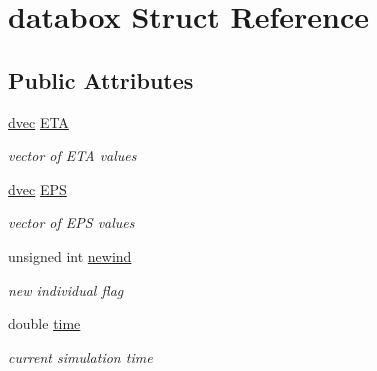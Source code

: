 \hypertarget{structdatabox}{}\section{databox Struct Reference}
\label{structdatabox}
\subsection*{Public Attributes}
\begin{DoxyCompactItemize}
\item 
\mbox{\label{structdatabox_afb21aefbdc05ea9b5aa6ef74231dbcf8}} 
\hyperlink{mrgsolv_8h_ac6aa1a2351760492203846ae74778c05}{dvec} \hyperlink{structdatabox_afb21aefbdc05ea9b5aa6ef74231dbcf8}{E\+TA}
\begin{DoxyCompactList}\small\item\em vector of E\+TA values \end{DoxyCompactList}\item 
\mbox{\label{structdatabox_acd473733c216baace06b5ebfe6b2c18f}} 
\hyperlink{mrgsolv_8h_ac6aa1a2351760492203846ae74778c05}{dvec} \hyperlink{structdatabox_acd473733c216baace06b5ebfe6b2c18f}{E\+PS}
\begin{DoxyCompactList}\small\item\em vector of E\+PS values \end{DoxyCompactList}\item 
\mbox{\label{structdatabox_abc3c551fc2e74c072e5950de8b1764b6}} 
unsigned int \hyperlink{structdatabox_abc3c551fc2e74c072e5950de8b1764b6}{newind}
\begin{DoxyCompactList}\small\item\em new individual flag \end{DoxyCompactList}\item 
\mbox{\label{structdatabox_a0d2ed2a088c86e0fee3a5d0613f26e83}} 
double \hyperlink{structdatabox_a0d2ed2a088c86e0fee3a5d0613f26e83}{time}
\begin{DoxyCompactList}\small\item\em current simulation time \end{DoxyCompactList}\item 
\mbox{\label{structdatabox_a3eef427a04c0d6fe56cf6b566eed1461}} 

\end{DoxyCompactItemize}

